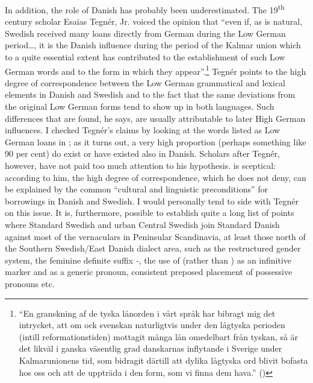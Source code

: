 In addition, the role of Danish has probably been underestimated. The 19\textsuperscript{th} century scholar Esaias Tegnér, Jr. voiced the opinion that “even if, as is natural, Swedish received many loans directly from German during the Low German period…, it is the Danish influence during the period of the Kalmar union which to a quite essential extent has contributed to the establishment of such Low German words and to the form in which they appear”.\footnote{ “En granskning af de tyska lånorden i vårt språk har bibragt mig det intrycket, att om ock svenskan naturligtvis under den lågtyska perioden (intill reformationstiden) mottagit många lån omedelbart från tyskan, så är det likväl i ganska väsentlig grad danskarnas inflytande i Sverige under Kalmarunionens tid, som bidragit därtill att dylika lågtyska ord blivit bofasta hos oss och att de uppträda i den form, som vi finna dem hava.” (\citealt[159]{Tegnér1889})} Tegnér points to the high degree of correspondence between the Low German grammatical and lexical elements in Danish and Swedish and to the fact that the same deviations from the original Low German forms tend to show up in both languages. Such differences that are found, he says, are usually attributable to later High German influences. I checked Tegnér’s claims by looking at the words listed as Low German loans in \citet{Hellquist1922}; as it turns out, a very high proportion (perhaps something like 90 per cent) do exist or have existed also in Danish. Scholars after Tegnér, however, have not paid too much attention to his hypothesis. \citet{Wessén1954} is sceptical: according to him, the high degree of correspondence, which he does not deny, can be explained by the common “cultural and linguistic preconditions” for borrowings in Danish and Swedish. I would personally tend to side with Tegnér on this issue. It is, furthermore, possible to establish quite a long list of points where Standard Swedish and urban Central Swedish join Standard Danish against most of the vernaculars in Peninsular Scandinavia, at least those north of the Southern Swedish/East Danish dialect area, such as the restructured gender system, the feminine definite suffix\textit{ {}-}, the use of  (rather than ) as an infinitive marker and  as a generic pronoun, consistent preposed placement of possessive pronouns etc. 

